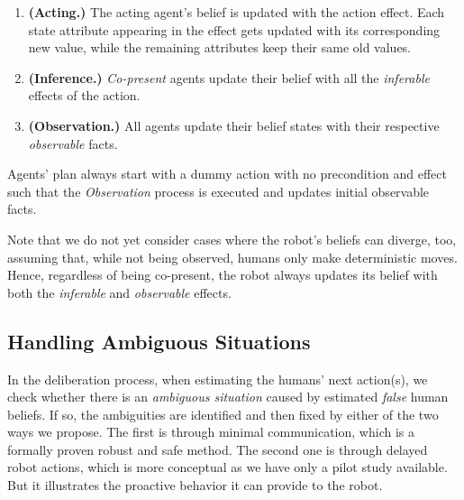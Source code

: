 \documentclass[letterpaper]{article} %
\begin{document}
\begin{enumerate}
    \item \textbf{(Acting.)} The acting agent's belief is updated with the action effect. Each state attribute appearing in the effect gets updated with its corresponding new value, while the remaining attributes keep their same old values.
    \item \textbf{(Inference.)} \textit{Co-present} agents update their belief with all the \textit{inferable} effects of the action.
    \item \textbf{(Observation.)} All agents update their belief states with their respective \textit{observable} facts.
\end{enumerate}

Agents' plan always start with a dummy action with no precondition and effect such that the \textit{Observation} process is executed and updates initial observable facts.


Note that we do not yet consider cases where the robot's beliefs can diverge, too, assuming that, while not being observed, humans only make deterministic moves. Hence, regardless of being co-present, the robot always updates its belief with both the \textit{inferable} and \textit{observable} effects.

\subsection{Handling Ambiguous Situations}
In the deliberation process, when estimating the humans' next action(s), we check whether there is an \textit{ambiguous situation} caused by estimated \textit{false} human beliefs. 
If so, the ambiguities are identified and then fixed by either of the two ways we propose.
The first is through minimal communication, which is a formally proven robust and safe method. The second one is through delayed robot actions, which is more conceptual as we have only a pilot study available. But it illustrates the proactive behavior it can provide to the robot.
\end{document}
